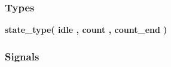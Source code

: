 \subsubsection*{Types}
 \begin{DoxyCompactItemize}
\item 
{\bfseries {\bf state\+\_\+type}{\bfseries \textcolor{vhdlchar}{(}\textcolor{vhdlchar}{ }\textcolor{vhdlchar}{idle}\textcolor{vhdlchar}{ }\textcolor{vhdlchar}{,}\textcolor{vhdlchar}{ }\textcolor{vhdlchar}{count}\textcolor{vhdlchar}{ }\textcolor{vhdlchar}{,}\textcolor{vhdlchar}{ }\textcolor{vhdlchar}{count\+\_\+end}\textcolor{vhdlchar}{ }\textcolor{vhdlchar}{)}\textcolor{vhdlchar}{ }}} 
\end{DoxyCompactItemize}
\subsubsection*{Signals}
